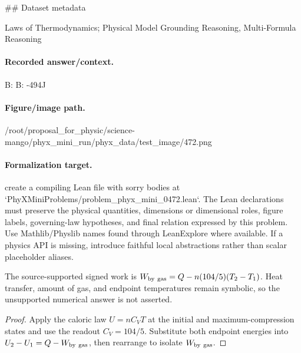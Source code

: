 \#\# Dataset metadata

Laws of Thermodynamics; Physical Model Grounding Reasoning, Multi-Formula Reasoning

\paragraph{Recorded answer/context.}
B: B: -494J

\paragraph{Figure/image path.}
/root/proposal\_for\_physic/science-mango/phyx\_mini\_run/phyx\_data/test\_image/472.png

\paragraph{Formalization target.}
create a compiling Lean file with sorry bodies at `PhyXMiniProblems/problem\_phyx\_mini\_0472.lean`. The Lean declarations must preserve the physical quantities, dimensions or dimensional roles, figure labels, governing-law hypotheses, and final relation expressed by this problem.
Use Mathlib/Physlib names found through LeanExplore where available. If a physics API is missing, introduce faithful local abstractions rather than scalar placeholder aliases.

\begin{theorem}
\label{thm:physics:phyx_mini_0472:target}
The source-supported signed work is $W_{\rm by\ gas}=Q-n(104/5)(T_2-T_1)$.  Heat transfer, amount of gas, and endpoint temperatures remain symbolic, so the unsupported numerical answer is not asserted.
\end{theorem}
\begin{proof}
Apply the caloric law $U=nC_VT$ at the initial and maximum-compression states and use the readout $C_V=104/5$.  Substitute both endpoint energies into $U_2-U_1=Q-W_{\rm by\ gas}$, then rearrange to isolate $W_{\rm by\ gas}$.
\end{proof}

